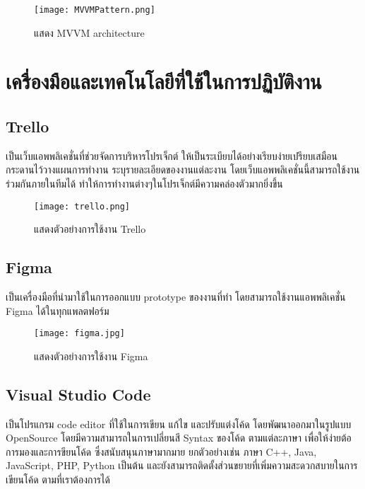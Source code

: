 \begin{figure}[H]
  \centering
  \texttt{[image: MVVMPattern.png]}
  \caption{แสดง MVVM architecture}
  \label{Fig:MVVMPattern}
\end{figure}

\newpage

\section{เครื่องมือและเทคโนโลยีที่ใช้ในการปฏิบัติงาน}

\subsection{Trello}

เป็นเว็บแอพพลิเคชั่นที่ช่วยจัดการบริหารโปรเจ็กต์ ให้เป็นระเบียบได้อย่างเรียบง่ายเปรียบเสมือนกระดานไว้วางแผนการทำงาน ระบุรายละเอียดของงานแต่ละงาน โดยเว็บแอพพลิเคชั่นนี้สามารถใช้งานร่วมกันภายในทีมได้ ทำให้การทำงานต่างๆในโปรเจ็กต์มีความคล่องตัวมากยิ่งขึ้น

\begin{figure}[H]
  \centering
  \texttt{[image: trello.png]}
  \caption{แสดงตัวอย่างการใช้งาน Trello}
  \label{Fig:trello}
\end{figure}

\subsection{Figma}

เป็นเครื่องมือที่นำมาใช้ในการออกแบบ prototype ของงานที่ทำ โดยสามารถใช้งานแอพพลิเคชั่น Figma ได้ในทุกแพลตฟอร์ม

\begin{figure}[H]
  \centering
  \texttt{[image: figma.jpg]}
  \caption{แสดงตัวอย่างการใช้งาน Figma}
  \label{Fig:figma}
\end{figure}

\subsection{Visual Studio Code}

เป็นโปรแกรม code editor ที่ใช้ในการเขียน แก้ไข และปรับแต่งโค้ด โดยพัฒนาออกมาในรูปแบบ OpenSource โดยมีความสามารถในการเปลี่ยนสี Syntax ของโค้ด ตามแต่ละภาษา เพื่อให้ง่ายต้อการมองและการขียนโค้ด ซึ่งสนับสนุนภาษามากมาย ยกตัวอย่างเช่น ภาษา C++, Java, JavaScript, PHP, Python เป็นต้น และยังสามารถติดตั้งส่วนขยายที่เพิ่มความสะดวกสบายในการเขียนโค้ด ตามที่เราต้องการได้

